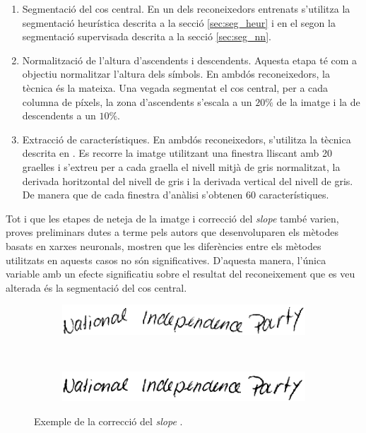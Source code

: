 \begin{enumerate}
\item Segmentació del cos central. En un dels reconeixedors entrenats s'utilitza la segmentació heurística descrita a la secció \ref{sec:seg_heur} i en el segon la segmentació supervisada descrita a la secció \ref{sec:seg_nn}.

\item Normalització de l'altura d'ascendents i descendents. Aquesta etapa té com a objectiu normalitzar l'altura dels símbols. En ambdós reconeixedors, la tècnica és la mateixa. Una vegada segmentat el cos central, per a cada columna de píxels, la zona d'ascendents s'escala a un $20\%$ de la imatge i la de descendents a un $10\%$.

\item Extracció de característiques. En ambdós reconeixedors, s'utilitza la tècnica descrita en \cite{toselli2004integrated,Pastor07}. Es recorre la imatge utilitzant una finestra lliscant amb 20 graelles i s'extreu per a cada graella el nivell mitjà de gris normalitzat, la derivada horitzontal del nivell de gris i la derivada vertical del nivell de gris. De manera que de cada finestra d'anàlisi s'obtenen 60 característiques.
\end{enumerate}
Tot i que les etapes de neteja de la imatge i correcció del \emph{slope} també varien, proves preliminars dutes a terme pels autors que desenvoluparen els mètodes basats en xarxes neuronals, mostren que les diferències entre els mètodes utilitzats en aquests casos no són significatives. D'aquesta manera, l'única variable amb un efecte significatiu sobre el resultat del reconeixement que es veu alterada és la segmentació del cos central.

\begin{figure}
\centering
\begin{subfigure}[b]{0.8\textwidth}
\centering
\includegraphics[width=\textwidth]{images/slope_orig.eps}
\caption{}\label{fig:slope_correction_orig}
\end{subfigure}\\
\begin{subfigure}[b]{0.8\textwidth}
\centering
\includegraphics[width=\textwidth]{images/slope_corr.eps}
\caption{}\label{fig:slope_correction_result}
\end{subfigure}
\caption{Exemple de la correcció del \emph{slope} \cite{Pastor07}.}\label{fig:slope_correction}
\end{figure}

